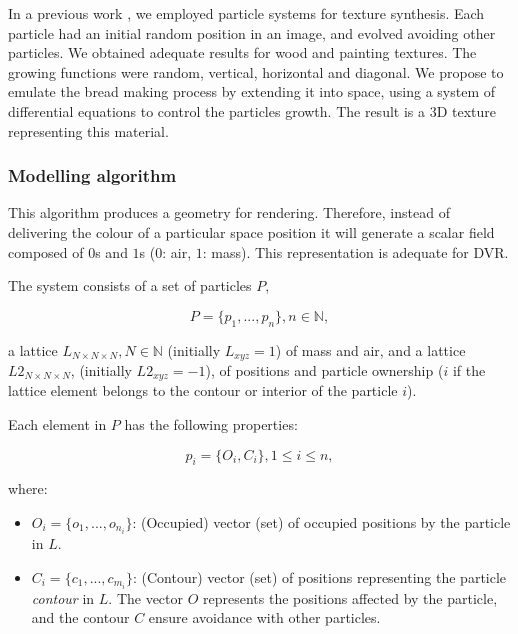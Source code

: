 \documentclass[oneside,a4paper,english,links]{amca}
\begin{document}
In a previous work \citep{Baravalle2011}, we employed particle systems for texture synthesis. Each particle had an initial random position in an image, and evolved avoiding other particles. We obtained adequate results for wood and painting textures. The growing functions were random, vertical, horizontal and diagonal. We propose to emulate the bread making process by extending it into space, using a system of differential equations to control the particles growth. The result is a 3D texture representing this material. 

\subsubsection{Modelling algorithm}
This algorithm produces a geometry for rendering. Therefore, instead of delivering the colour of a particular space position it will generate a scalar field composed of $0$s and $1$s ($0$: air, $1$: mass). This representation is adequate for DVR.

The system consists of a set of particles $P$, 

\begin{equation}
  P = \{p_{1}, ... , p_{n}\}, n  \in \mathbb{N},
\end{equation}

\noindent a lattice $L_{N\times N \times N}, N \in \mathbb{N} $ (initially $L_{xyz}=1$) of mass and air, and a lattice $L2_{N\times N \times N}$, (initially $L2_{xyz}=-1$), of positions and particle ownership ($i$ if the lattice element belongs to the contour or interior of the particle $i$).

Each element in $P$ has the following properties:

\begin{equation}
  p_{i} = \{O_{i}, C_{i}\}, 1 \le i \le n,
\end{equation}

\noindent where:

\begin{itemize}
\item $O_{i} = \{o_{1}, ... , o_{n_{i}}\}$: (Occupied) vector (set) of occupied positions by the particle in $L$.

\item $C_{i} = \{c_{1}, ... , c_{m_{i}}\}$: (Contour) vector (set) of positions representing the particle {\em contour} in $L$. The vector $O$ represents the positions affected by the particle, and the contour $C$ ensure avoidance with other particles.
\end{itemize}
\end{document}
